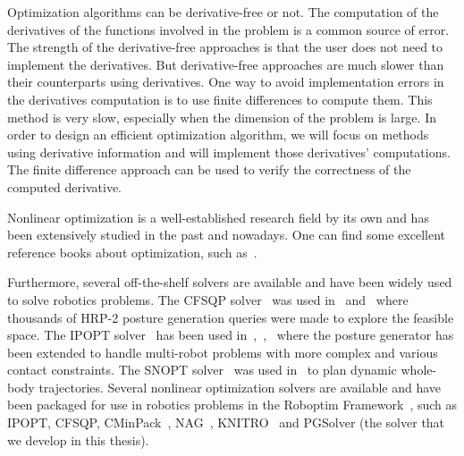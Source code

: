 Optimization algorithms can be derivative-free or not.
The computation of the derivatives of the functions involved in the problem is a common source of error.
The strength of the derivative-free approaches is that the user does not need to implement the derivatives.
But derivative-free approaches are much slower than their counterparts using derivatives.
One way to avoid implementation errors in the derivatives computation is to use finite differences to compute them.
This method is very slow, especially when the dimension of the problem is large.
In order to design an efficient optimization algorithm, we will focus on methods using derivative information and will implement those derivatives' computations.
The finite difference approach can be used to verify the correctness of the computed derivative.

Nonlinear optimization is a well-established research field by its own and has been extensively studied in the past and nowadays.
One can find some excellent reference books about optimization, such as~\cite{nocedal:book:2006, bonnans:book:2003, boyd2004convex}.

Furthermore, several off-the-shelf solvers are available and have been widely used to solve robotics problems.
The CFSQP solver~\cite{cfsqp:manual} was used in~\cite{escande:iros:2009} and~\cite{escande:ras:2013} where thousands of HRP-2 posture generation queries were made to explore the feasible space.
The IPOPT solver~\cite{wachter:mathprog:2006} has been used in~\cite{vaillant:humanoids:2014},~\cite{vaillant:autonomousrobots:2016},~\cite{bouyarmane:ar:2012} where the posture generator has been extended to handle multi-robot problems with more complex and various contact constraints.
The SNOPT solver~\cite{gill2005snopt} was used in~\cite{dai2014whole} to plan dynamic whole-body trajectories.
Several nonlinear optimization solvers are available and have been packaged for use in robotics problems in the Roboptim Framework~\cite{moulard:jsme:2013}, such as IPOPT, CFSQP, CMinPack~\cite{cminpack}, NAG~\cite{nag}, KNITRO~\cite{knitro} and PGSolver (the solver that we develop in this thesis).

